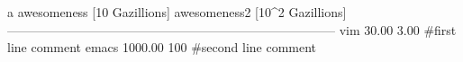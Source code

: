   a       awesomeness [10 Gazillions]        awesomeness2 [10^2 Gazillions]     
  ------------------------------------------------------------------------------
  vim     30.00                              3.00                                #first line comment
  emacs   1000.00                            100                                 #second line comment
